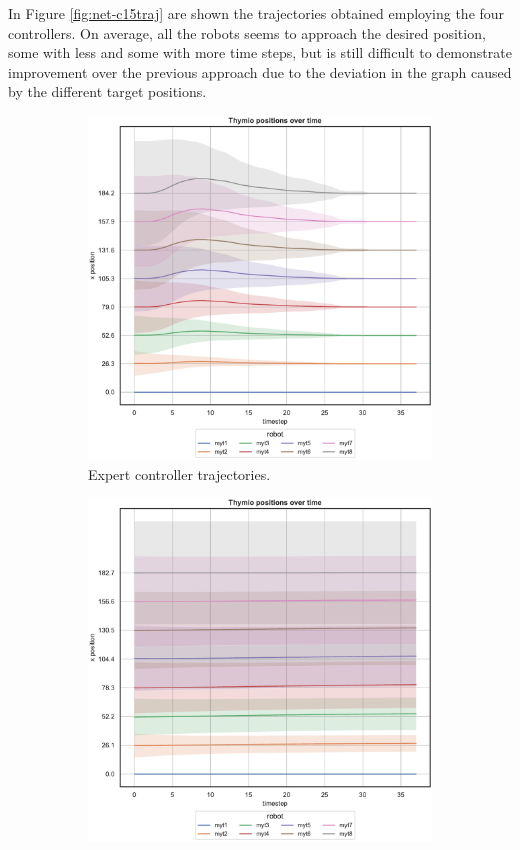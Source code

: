 In Figure \ref{fig:net-c15traj} are shown the trajectories obtained employing the 
four controllers.  On average, all the robots seems to approach the desired 
position, some with less and some with more time steps, but is still difficult 
to demonstrate improvement over the previous approach due to the deviation in 
the graph caused by the different target positions.
\begin{figure}[!htb]
	\begin{center}
		\begin{subfigure}[h]{0.49\textwidth}
			\centering
			\includegraphics[width=.9\textwidth]{contents/images/net-d15/position-overtime-omniscient}%
			\caption{Expert controller trajectories.}
		\end{subfigure}
		\hfill
		\begin{subfigure}[h]{0.49\textwidth}
			\centering
			\includegraphics[width=.9\textwidth]{contents/images/net-d15/position-overtime-learned_distributed}

\end{subfigure}
\end{center}
\end{figure}
